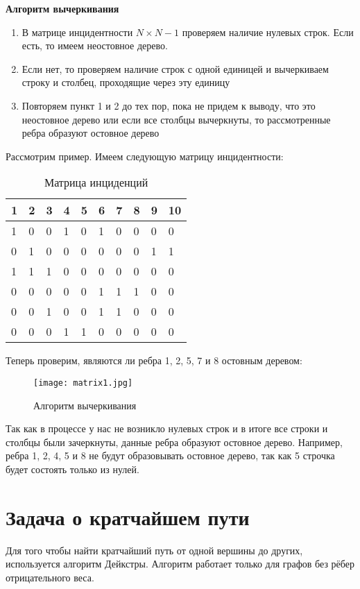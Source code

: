 \hspace{5mm}

\textbf{Алгоритм вычеркивания}
\begin{enumerate}
    \item В матрице инцидентности $N \times N-1$ проверяем наличие нулевых строк. 
    Если есть, то имеем неостовное дерево.
    \item Если нет, то проверяем наличие строк с одной единицей
    и вычеркиваем строку и столбец, проходящие через эту единицу
    \item Повторяем пункт 1 и 2 до тех пор, пока не придем к выводу, что это неостовное дерево или
    если все столбцы вычеркнуты, то рассмотренные ребра образуют остовное дерево
\end{enumerate}

Рассмотрим пример. Имеем следующую матрицу инцидентности:
\begin{table}[h]
    \centering
    \begin{tabular}[c]{ | l | l | l | l | l | l | l | l | l | l | }
        \hline
        1 & 2 & 3 & 4 & 5 & 6 & 7 & 8 & 9 & 10 \\ \hline
        1 & 0 & 0 & 1 & 0 & 1 & 0 & 0 & 0 & 0 \\ \hline
        0 & 1 & 0 & 0 & 0 & 0 & 0 & 0 & 1 & 1 \\ \hline
        1 & 1 & 1 & 0 & 0 & 0 & 0 & 0 & 0 & 0 \\ \hline
        0 & 0 & 0 & 0 & 0 & 1 & 1 & 1 & 0 & 0 \\ \hline
        0 & 0 & 1 & 0 & 0 & 1 & 1 & 0 & 0 & 0 \\ \hline
        0 & 0 & 0 & 1 & 1 & 0 & 0 & 0 & 0 & 0 \\ 
        \hline
    \end{tabular}
    \caption{Матрица инциденций}
\end{table}

Теперь проверим, являются ли ребра 1, 2, 5, 7 и 8 остовным деревом:
\begin{figure}[!h]
    \centering 
    \texttt{[image: matrix1.jpg]}
    \caption{Алгоритм вычеркивания}
\end{figure}

Так как в процессе у нас не возникло нулевых строк и в итоге все строки и столбцы 
были зачеркнуты, данные ребра образуют остовное дерево.
Например, ребра 1, 2, 4, 5 и 8 не будут образовывать остовное дерево, так как 5
строчка будет состоять только из нулей.

\section{Задача о кратчайшем пути}
Для того чтобы найти кратчайший путь от одной вершины до других, используется алгоритм Дейкстры.
Алгоритм работает только для графов без рёбер отрицательного веса.

